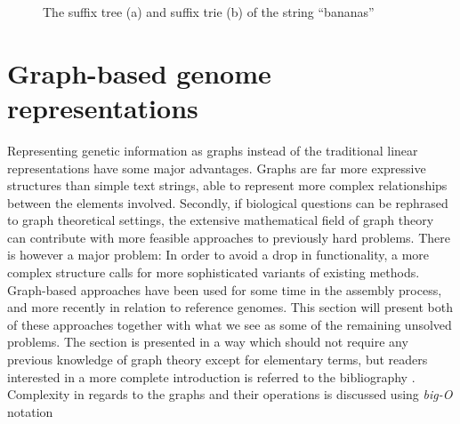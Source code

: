 \documentclass[thesis.tex]{subfiles}
\begin{document}
\begin{figure}[hb]
\begin{minipage}[t]{0.49\textwidth}
\begin{subfigure}[t]{\textwidth}
\begin{mdframed}
\begin{center}
      \end{center}
    \end{mdframed}
    \caption{}
    \label{fig:suffix_tree}
  \end{subfigure}
  \begin{minipage}[t]{0.49\textwidth}
    \caption{The suffix tree (a) and suffix trie  (b) of the string ``bananas''}
  \end{minipage}
  \end{minipage}
  \label{fig:suffix_trees}
\end{figure}
\clearpage
\section{Graph-based genome representations}
Representing genetic information as graphs instead of the traditional linear representations have some major advantages. Graphs are far more expressive structures than simple text strings, able to represent more complex relationships between the elements involved. Secondly, if biological questions can be rephrased to graph theoretical settings, the extensive mathematical field of graph theory can contribute with more feasible approaches to previously hard problems. There is however a major problem: In order to avoid a drop in functionality, a more complex structure calls for more sophisticated variants of existing methods. Graph-based approaches have been used for some time in the assembly process, and more recently in relation to reference genomes. This section will present both of these approaches together with what we see as some of the remaining unsolved problems. The section is presented in a way which should not require any previous knowledge of graph theory except for elementary terms, but readers interested in a more complete introduction is referred to the bibliography \cite[Chapter 0]{introduction_to_the_theory_of_computation} \cite[Chapter 9]{data_structures_and_algorithm_analysis_in_java} \cite[Chapter 11]{algorithms_sequential_parallell_and_distributed}. Complexity in regards to the graphs and their operations is discussed using \textit{big-O} notation \cite[Chapter 2]{data_structures_and_algorithm_analysis_in_java}\cite[Section 3.1]{algorithms_sequential_parallell_and_distributed}
\end{document}
